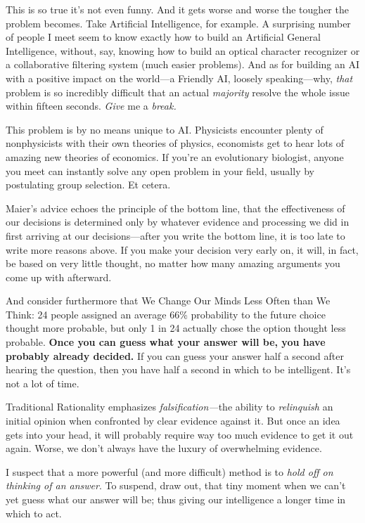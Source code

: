 {
 This is so true it's not even funny. And it gets
worse and worse the tougher the problem becomes. Take Artificial
Intelligence, for example. A surprising number of people I meet seem to
know exactly how to build an Artificial General Intelligence, without,
say, knowing how to build an optical character recognizer or a
collaborative filtering system (much easier problems). And as for
building an AI with a positive impact on the world---a Friendly AI,
loosely speaking---why, \textit{that} problem is so incredibly
difficult that an actual \textit{majority} resolve the whole issue
within fifteen seconds. \textit{Give} me a \textit{break.}}

{
 This problem is by no means unique to AI. Physicists encounter
plenty of nonphysicists with their own theories of physics, economists
get to hear lots of amazing new theories of economics. If
you're an evolutionary biologist, anyone you meet can
instantly solve any open problem in your field, usually by postulating
group selection. Et cetera.}

{
 Maier's advice echoes the principle of the bottom
line, that the effectiveness of our decisions is determined only by
whatever evidence and processing we did in first arriving at our
decisions---after you write the bottom line, it is too late to write
more reasons above. If you make your decision very early on, it will,
in fact, be based on very little thought, no matter how many amazing
arguments you come up with afterward.}

{
 And consider furthermore that We Change Our Minds Less Often than
We Think: 24 people assigned an average 66\% probability to the future
choice thought more probable, but only 1 in 24 actually chose the
option thought less probable. \textbf{Once you can guess what your
answer will be, you have probably already decided.} If you can guess
your answer half a second after hearing the question, then you have
half a second in which to be intelligent. It's not a
lot of time.}

{
 Traditional Rationality emphasizes \textit{falsification---}the
ability to \textit{relinquish} an initial opinion when confronted by
clear evidence against it. But once an idea gets into your head, it
will probably require way too much evidence to get it out again. Worse,
we don't always have the luxury of overwhelming
evidence.}

{
 I suspect that a more powerful (and more difficult) method is to
\textit{hold off on thinking of an answer}. To suspend, draw out, that
tiny moment when we can't yet guess what our answer
will be; thus giving our intelligence a longer time in which to act.}

